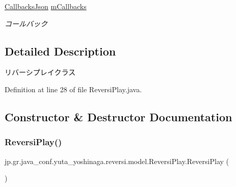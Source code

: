 \begin{DoxyCompactItemize}
\mbox{\label{classjp_1_1gr_1_1java__conf_1_1yuta__yoshinaga_1_1reversi_1_1model_1_1_reversi_play_a9b8dce5e6539e8572622befd2391ebb4}} 
\hyperlink{classjp_1_1gr_1_1java__conf_1_1yuta__yoshinaga_1_1reversi_1_1model_1_1_callbacks_json}{Callbacks\+Json} \hyperlink{classjp_1_1gr_1_1java__conf_1_1yuta__yoshinaga_1_1reversi_1_1model_1_1_reversi_play_a9b8dce5e6539e8572622befd2391ebb4}{m\+Callbacks}
\begin{DoxyCompactList}\small\item\em コールバック \end{DoxyCompactList}\end{DoxyCompactItemize}


\subsection{Detailed Description}
リバーシプレイクラス 

Definition at line 28 of file Reversi\+Play.\+java.



\subsection{Constructor \& Destructor Documentation}
\mbox{\label{classjp_1_1gr_1_1java__conf_1_1yuta__yoshinaga_1_1reversi_1_1model_1_1_reversi_play_a8244dde6e8abc75432834de7ccb4f52c}} 
\subsubsection{\texorpdfstring{Reversi\+Play()}{ReversiPlay()}}
{\footnotesize\ttfamily jp.\+gr.\+java\+\_\+conf.\+yuta\+\_\+yoshinaga.\+reversi.\+model.\+Reversi\+Play.\+Reversi\+Play (\begin{DoxyParamCaption}{ }\end{DoxyParamCaption})}



